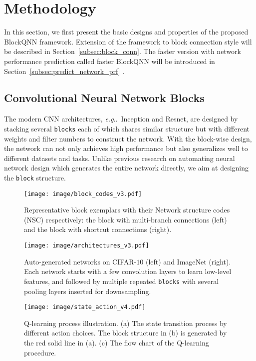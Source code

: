 \documentclass[10pt,journal,compsoc]{IEEEtran}
\makeatletter
\DeclareRobustCommand\onedot{\futurelet\@let@token\@onedot}
\def\@onedot{\ifx\@let@token.\else.\null\fi\xspace}
\def\eg{\emph{e.g}\onedot} \def\Eg{\emph{E.g}\onedot}
\makeatother
\begin{document}
\section{Methodology}
\label{sec:method}
In this section, we first present the basic designs and properties of the proposed BlockQNN framework. Extension of the framework to block connection style will be described in Section~\ref{subsec:block_conn}. The faster version with network performance prediction called faster BlockQNN will be introduced in Section~\ref{subsec:predict_network_prf} .

\subsection{ Convolutional Neural Network Blocks}
\label{subsec:blocks}

The modern CNN architectures, \eg~Inception and Resnet, are designed by stacking several \texttt{blocks} each of which shares similar structure but with different weights and filter numbers to construct the network. With the block-wise design, the network can not only achieves high performance but also generalizes well to different datasets and tasks. Unlike previous research on automating neural network design which generates the entire network directly, we aim at designing the \texttt{block} structure.

\begin{figure}[tbp]
	\centering
	\texttt{[image: image/block\_codes\_v3.pdf]}
	\caption{Representative block exemplars with their Network structure codes (NSC) respectively: the block with multi-branch connections (left) and the block with shortcut connections (right).}
	\label{fig:block_codes}
\end{figure}

\begin{figure}[tbp]
	\centering
	\texttt{[image: image/architectures\_v3.pdf]}
	\caption{Auto-generated networks on CIFAR-$10$ (left) and ImageNet (right). Each network starts with a few convolution layers to learn low-level features, and followed by multiple repeated \texttt{blocks} with several pooling layers inserted for downsampling.}
	\label{fig:architectures}
\end{figure}

\begin{figure*}[tbp]
	\centering
	\texttt{[image: image/state\_action\_v4.pdf]}
	\caption{Q-learning process illustration. (a) The state transition process by different action choices. The block structure in (b) is generated by the red solid line in (a). (c) The flow chart of the Q-learning procedure.}
	\label{fig:state_action}
\end{figure*}
\end{document}
